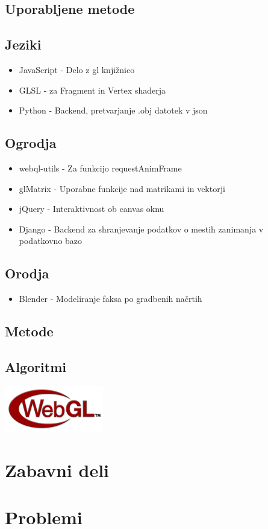 \documentclass[10pt,a4paper]{article}
\begin{document}
\subsection{Uporabljene metode}
\subsection*{Jeziki}
\begin{itemize}
	\item JavaScript - Delo z gl knjižnico
	\item GLSL - za Fragment in Vertex shaderja
	\item Python - Backend, pretvarjanje .obj datotek v json
\end{itemize}
\subsection*{Ogrodja}
\begin{itemize}
	\item webql-utils - Za funkcijo requestAnimFrame
	\item glMatrix - Uporabne funkcije nad matrikami in vektorji
	\item jQuery - Interaktivnost ob canvas oknu
	\item Django - Backend za shranjevanje podatkov o mestih zanimanja v podatkovno bazo 
\end{itemize}
\subsection*{Orodja}
\begin{itemize}
	\item Blender - Modeliranje faksa po gradbenih načrtih
\end{itemize}
\subsection*{Metode}
\subsection*{Algoritmi}

\begin{center}
\includegraphics{./WebGL.png}
\end{center}
\section{Zabavni deli}
\section{Problemi}
\end{document}
